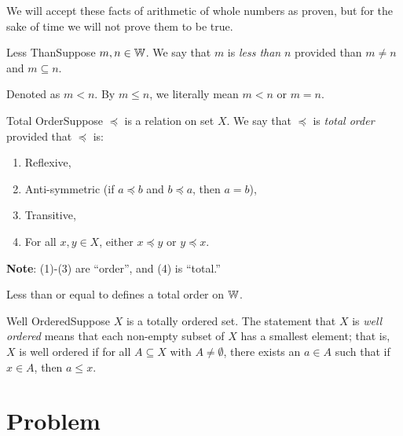             We will accept these facts of arithmetic of whole numbers as proven, but for the sake of time we will not prove them to be true. 

        \begin{definition}
            {Less Than}Suppose \(m,n\in \mathbb{W}\). We say that \(m\) is \textit{less than} \(n\) provided than \(m \ne n\) and \(m \subseteq n\).

            Denoted as \(m < n\). By \(m \leq n\), we literally mean \(m < n\) or \(m = n\).
        \end{definition}

    
            \begin{definition}
                {Total Order}Suppose \(\preceq\) is a relation on set \(X\). We say that \(\preceq\) is \textit{total order} provided that \(\preceq\) is: \begin{enumerate}
                    \item Reflexive,
                    \item Anti-symmetric (if \(a \preceq b\) and \(b \preceq a\), then \(a = b\)),
                    \item Transitive,
                    \item For all \(x,y\in X\), either \(x\preceq y\) or \(y\preceq x\).
                \end{enumerate}
            \end{definition}
        
        \noindent\textbf{Note}: (1)-(3) are ``order'', and (4) is ``total.''


            \begin{theorem}
                Less than or equal to defines a total order on \(\mathbb{W}\).
            \end{theorem}

    
            \begin{definition}
                {Well Ordered}Suppose \(X\) is a totally ordered set. The statement that \(X\) is \textit{well ordered} means that each non-empty subset of \(X\) has a smallest element; that is, \(X\) is well ordered if for all \(A \subseteq X\) with \(A\ne \emptyset\), there exists an \(a \in A\) such that if \(x \in A\), then \(a \leq x\).
            \end{definition}

        \section{Problem}

